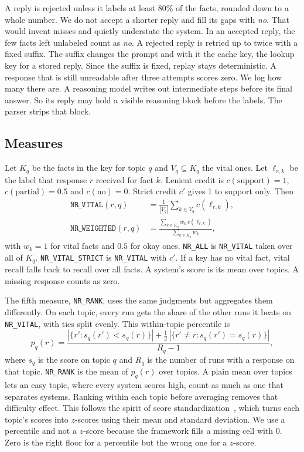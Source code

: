 A reply is rejected unless it labels at least 80\% of the facts, rounded down to a
whole number. We do not accept a shorter reply and fill its gaps with \emph{no}.
That would invent misses and quietly understate the system. In an accepted reply,
the few facts left unlabeled count as \emph{no}. A rejected reply is retried up to
twice with a fixed suffix. The suffix changes the prompt and with it the cache key,
the lookup key for a stored reply. Since the suffix is fixed, replay stays
deterministic. A response that is still unreadable after three attempts scores
zero. We log how many there are. A reasoning model writes out intermediate steps
before its final answer. So its reply may hold a visible reasoning block before
the labels. The parser strips that block.

\subsection{Measures}

Let $K_q$ be the facts in the key for topic $q$ and $V_q \subseteq K_q$ the vital
ones. Let $\ell_{r,k}$ be the label that response $r$ received for fact $k$.
Lenient credit is $c(\text{support})=1$, $c(\text{partial})=0.5$ and
$c(\text{no})=0$. Strict credit $c'$ gives 1 to support only. Then
\begin{align}
  \texttt{NR\_VITAL}(r,q) &= \frac{1}{|V_q|}\sum_{k\in V_q} c(\ell_{r,k}),\\
  \texttt{NR\_WEIGHTED}(r,q) &= \frac{\sum_{k\in K_q} w_k\, c(\ell_{r,k})}{\sum_{k\in K_q} w_k},
\end{align}
with $w_k=1$ for vital facts and $0.5$ for okay ones. \texttt{NR\_ALL} is
\texttt{NR\_VITAL} taken over all of $K_q$. \texttt{NR\_VITAL\_STRICT} is
\texttt{NR\_VITAL} with $c'$. If a key has no vital fact, vital recall falls back to
recall over all facts. A system's score is its mean over topics. A missing response
counts as zero.

The fifth measure, \texttt{NR\_RANK}, uses the same judgments but aggregates them
differently. On each topic, every run gets the share of the other runs it beats on
\texttt{NR\_VITAL}, with ties split evenly. This within-topic percentile is
\begin{equation}
  \label{eq:percentile}
  p_q(r) = \frac{|\{r' : s_q(r') < s_q(r)\}| + \tfrac{1}{2}\,|\{r'\neq r : s_q(r') = s_q(r)\}|}{R_q - 1},
\end{equation}
where $s_q$ is the score on topic $q$ and $R_q$ is the number of runs with a
response on that topic. \texttt{NR\_RANK} is the mean of $p_q(r)$ over topics. A
plain mean over topics lets an easy topic, where every system scores high, count as
much as one that separates systems. Ranking within each topic before averaging
removes that difficulty effect. This follows the spirit of score
standardization~\cite{webber2008standardization}, which turns each topic's scores
into $z$-scores using their mean and standard deviation. We use a percentile and
not a $z$-score because the framework fills a missing cell with 0. Zero is the
right floor for a percentile but the wrong one for a $z$-score.

